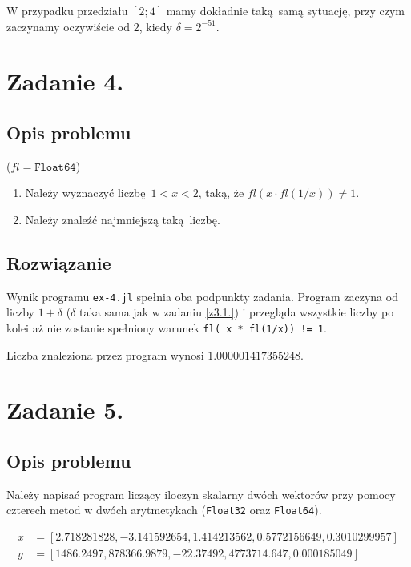 \documentclass[10pt]{article}
\begin{document}
W przypadku przedziału $[2;4]$ mamy dokładnie taką samą sytuację, przy czym zaczynamy oczywiście od $2$, kiedy $\delta = 2^{-51}$.

\section{Zadanie 4.}

\subsection{Opis problemu}

($fl = \texttt{Float64}$)

\begin{enumerate}
    \item Należy wyznaczyć liczbę $1 < x < 2$, taką, że $fl(x \cdot fl(1/x)) \neq 1$.
    \item Należy znaleźć najmniejszą taką liczbę.
\end{enumerate}

\subsection{Rozwiązanie}

Wynik programu \texttt{ex-4.jl} spełnia oba podpunkty zadania. Program zaczyna od liczby $1 + \delta$ ($\delta$ taka sama jak w zadaniu \ref*{z3.1.}) i przegląda wszystkie liczby po kolei aż nie zostanie spełniony warunek \texttt{fl( x * fl(1/x)) != 1}.

Liczba znaleziona przez program wynosi $1.000001417355248$.

\section{Zadanie 5.}

\subsection{Opis problemu}
Należy napisać program liczący iloczyn skalarny dwóch wektorów przy pomocy czterech metod w dwóch arytmetykach (\texttt{Float32} oraz \texttt{Float64}).

$$
\begin{aligned}
    x &= [2.718281828, -3.141592654, 1.414213562, 0.5772156649, 0.3010299957]\\
    y &= [1486.2497, 878366.9879, -22.37492, 4773714.647, 0.000185049]
\end{aligned}
$$
\end{document}

